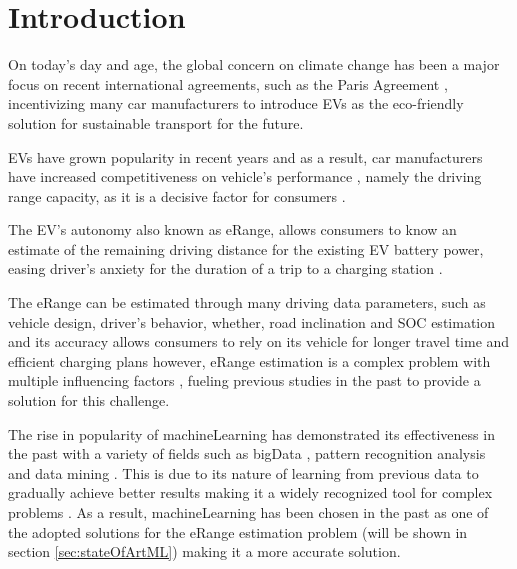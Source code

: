 \chapter{Introduction}
\label{cha:introduction}

On today's day and age, the global concern on climate
change has been a major focus on recent international agreements,
such as the Paris Agreement \citep{parisAgreement},
incentivizing many car manufacturers to introduce
\glspl{EV} as the eco-friendly
solution for sustainable transport for the future.

\glspl{EV} have grown popularity in
recent years and as a result, car manufacturers have
increased competitiveness on vehicle's performance
\citep{evCompetitiveness}, namely the driving range 
capacity, as it is a decisive factor for
consumers \citep{EGBUE2012717}.

The \gls{EV}'s autonomy also known as \gls{eRange},
allows consumers to know an estimate of the
remaining driving distance for the existing \gls{EV}
battery power, easing driver's anxiety for the duration
of a trip to a charging station \citep{eRangeFactors, driverAnxiety}.

The \gls{eRange} can be estimated through many
driving data parameters,
such as vehicle design, driver's behavior, whether,
road inclination and \gls{SOC} estimation and its
accuracy allows consumers to rely
on its vehicle for longer travel time and efficient
charging plans however, \gls{eRange} estimation
is a complex problem with multiple influencing
factors \citep{predictionOfeRange}, fueling previous
studies in the past to provide a solution for this challenge.

The rise in popularity of \gls{machineLearning}
\citep{machineLearningCaseStudy}
has demonstrated its effectiveness in the
past with a variety of fields such as \gls{bigData}
\citep{machineLearningBigData, machineLearningBigData2},
pattern recognition analysis and data mining
\citep{businessDataMining}.  
This is due to its nature of learning 
from previous data to gradually achieve
better results making it a widely 
recognized tool for complex problems 
\citep{mitchelllearning}.
As a result, \gls{machineLearning}
has been chosen in the past 
as one of the adopted solutions for 
the \gls{eRange} estimation problem 
(will be shown in section \ref{sec:stateOfArtML})
making it a more accurate solution.  

